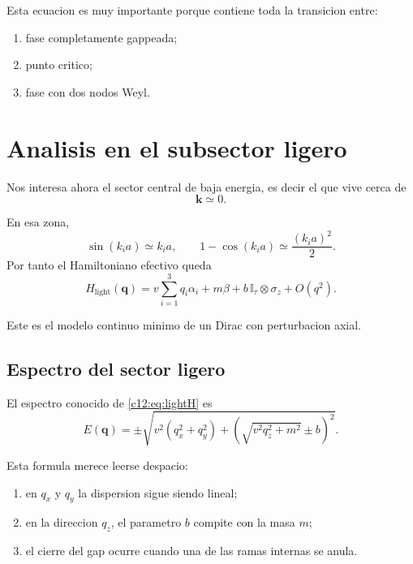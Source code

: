 Esta ecuacion es muy importante porque contiene toda la transicion entre:
\begin{enumerate}[label=\arabic*.]
    \item fase completamente gappeada;
    \item punto critico;
    \item fase con dos nodos Weyl.
\end{enumerate}

\section{Analisis en el subsector ligero}
Nos interesa ahora el sector central de baja energia, es decir el que vive cerca de
\begin{equation}
\bm{k}\simeq 0.
\end{equation}

En esa zona,
\begin{equation}
\sin(k_i a)\simeq k_i a,
\qquad
1-\cos(k_i a)\simeq \frac{(k_i a)^2}{2}.
\end{equation}
Por tanto el Hamiltoniano efectivo queda
\begin{equation}
H_{\text{light}}(\bm{q})=
v\sum_{i=1}^3 q_i \alpha_i
+
m\beta
+
b\,\mathbb{I}_\tau\otimes \sigma_z
+
O(q^2).
\label{c12:eq:lightH}
\end{equation}

Este es el modelo continuo minimo de un Dirac con perturbacion axial.

\subsection{Espectro del sector ligero}
El espectro conocido de \eqref{c12:eq:lightH} es
\begin{equation}
E(\bm{q})=
\pm
\sqrt{
v^2(q_x^2+q_y^2)
+
\left(
\sqrt{v^2 q_z^2 + m^2}\pm b
\right)^2
}.
\label{c12:eq:lowspec}
\end{equation}

Esta formula merece leerse despacio:
\begin{enumerate}[label=\arabic*.]
    \item en \(q_x\) y \(q_y\) la dispersion sigue siendo lineal;
    \item en la direccion \(q_z\), el parametro \(b\) compite con la masa \(m\);
    \item el cierre del gap ocurre cuando una de las ramas internas se anula.
\end{enumerate}

